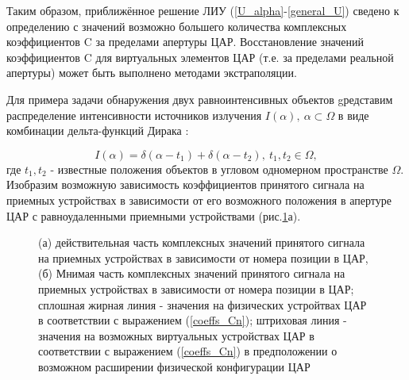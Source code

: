\documentclass{article}
\begin{document}
	Таким образом, приближённое решение ЛИУ (\ref{U_alpha}-\ref{general_U}) сведено к определению с значений возможно большего количества комплексных коэффициентов C за пределами апертуры ЦАР. Восстановление значений коэффициентов C для виртуальных элементов ЦАР (т.е. за пределами реальной апертуры) может быть выполнено методами экстраполяции.
	
	Для примера задачи обнаружения двух равноинтенсивных объектов gредставим распределение интенсивности источников излучения $I(\alpha),\ \alpha \subset \Omega$ в виде комбинации дельта-функций Дирака \cite{lit22}:
	
	\begin{equation}
		I(\alpha) = \delta(\alpha - t_1) + \delta(\alpha - t_2), \ t_1,t_2 \in \Omega,
	\end{equation}
	где $t_1, t_2$ - известные положения объектов в угловом одномерном пространстве $\Omega$.
	Изобразим возможную зависимость коэффициентов принятого сигнала на приемных устройствах в зависимости от его возможного положения в апертуре ЦАР с равноудаленными приемными устройствами (рис.\ref{fig:1}а).
	 
		\begin{figure}[h]
		\centering
			\caption{(а) действительная часть комплексных значений принятого сигнала на приемных устройствах в зависимости от номера позиции в ЦАР, (б) Мнимая часть комплексных значений принятого сигнала на приемных устройствах в зависимости от номера позиции в ЦАР; сплошная жирная линия - значения на физических устройтвах ЦАР в соответствии с выражением (\ref{coeffs_Cn}); штриховая линия - значения на возможных виртуальных устройствах ЦАР в соответствии с выражением (\ref{coeffs_Cn}) в предположении о возможном расширении физической конфигурации ЦАР}
		\label{fig:1}
		\end{figure}
	
\end{document}
